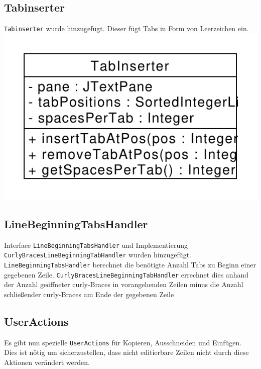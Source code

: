 \documentclass[a4paper]{scrreprt}
\begin{document}
\subsection{Tabinserter}
\verb!Tabinserter! wurde hinzugefügt. Dieser fügt Tabs in Form von Leerzeichen ein.\\
\includegraphics[scale=0.5]{TabInserter.pdf}\\
\subsection{LineBeginningTabsHandler}
Interface \verb!LineBeginningTabsHandler! und Implementierung \verb!CurlyBracesLineBeginningTabHandler! wurden hinzugefügt. \verb!LineBeginningTabsHandler! berechnet die benötigte Anzahl Tabs zu Beginn einer gegebenen Zeile. \verb!CurlyBracesLineBeginningTabHandler! errechnet dies anhand der Anzahl geöffneter curly-Braces in vorangehenden Zeilen minus die Anzahl schließender curly-Braces am Ende der gegebenen Zeile\\
\subsection{UserActions}
Es gibt nun spezielle \verb!UserActions! für Kopieren, Ausschneiden und Einfügen. Dies ist nötig um sicherzustellen, dass nicht editierbare Zeilen nicht durch diese Aktionen verändert werden.\\
\end{document}
